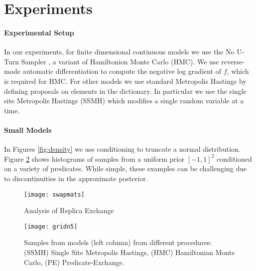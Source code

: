 
\section{Experiments}\label{experiments}

\paragraph{Experimental Setup} In our experiments, for finite dimensional continuous models we use the No U-Turn Sampler \cite{hoffman2014no}, a variant of Hamiltonion Monte Carlo (HMC).
We use reverse-mode automatic differentiation \cite{griewank2008evaluating} to compute the negative log gradient of $f$, which is required for HMC.
For other models we use standard Metropolis Hastings by defining proposals on elements in the dictionary.
In particular we use the single site Metropolis Hastings (SSMH) \cite{wingate2011lightweight} which modifies a single random variable at a time.


\paragraph{Small Models}
In Figures \ref{fig:density} we use conditioning to truncate a normal distribution. Figure  \ref{gridn} shows histograms of samples from a uniform prior  $[-1, 1]^2$ conditioned on a variety of predicates.  While simple, these examples can be challenging due to discontinuities in the approximate posterior.

\begin{figure}[!htb]
	\centering
	\texttt{[image: swapmats]}
	\caption{Analysis of Replica Exchange}
	\label{swapmats}
\end{figure}	


\begin{figure}[!htb]
	\centering
	\texttt{[image: gridn5]}
	\caption{Samples from models (left column) from different procedures: (SSMH) Single Site Metropolis Hastings, (HMC) Hamiltonian Monte Carlo, (PE) Predicate-Exchange.}
	\label{gridn}
\end{figure}	

